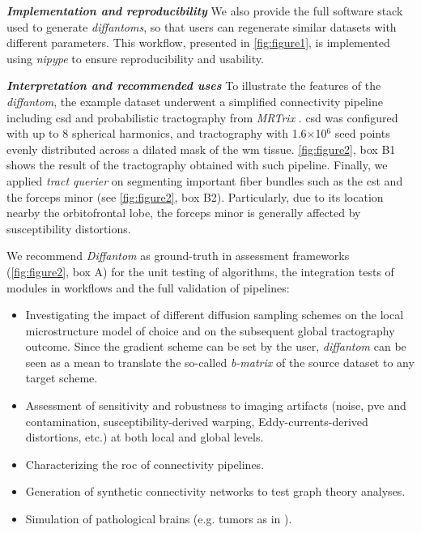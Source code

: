 \documentclass[english]{frontiers/frontiersSCNS} %
\newcommand*\glslines[2][]{\glslink[#1]{#2}{\glsdisp{#2}{\acrlong{#2} --\glsentryshort{#2}--}}}
\begin{document}
\noindent\textbf{\textit{Implementation and reproducibility\textcolon}\label{sec:data_workflow}} %
We also provide the full software stack used to generate \emph{diffantoms}, so that users can
  regenerate similar datasets with different parameters.
This workflow, presented in \autoref{fig:figure1}, is implemented using
  \emph{nipype} \citep{gorgolewski_nipype_2011} to ensure reproducibility and usability.

\noindent\textbf{\textit{Interpretation and recommended uses\textcolon}\label{sec:data_use}} %
To illustrate the features of the \emph{diffantom}, the example dataset underwent a simplified
  connectivity pipeline including \gls*{csd} and probabilistic tractography from
  \emph{MRTrix} \citep{tournier_mrtrix_2012}.
\Gls*{csd} was configured with up to 8 spherical harmonics, and tractography with 1.6$\times$10$^\text{6}$
  seed points evenly distributed across a dilated mask of the \gls*{wm} tissue.
\autoref{fig:figure2}, box B1 shows the result of the tractography obtained with such pipeline.
Finally, we applied \emph{tract querier} \citep{wassermann_on_2013} on segmenting important fiber bundles such
  as the \gls*{cst} and the forceps minor (see \autoref{fig:figure2}, box B2).
Particularly, due to its location nearby the orbitofrontal lobe, the forceps minor is generally affected by
  susceptibility distortions.

We recommend \emph{Diffantom} as ground-truth in assessment frameworks (\autoref{fig:figure2}, box A)
  for the unit testing of algorithms, the integration tests of modules in workflows and the full
  validation of pipelines:
\begin{itemize}
  \item Investigating the impact of different diffusion sampling schemes on the local microstructure
    model of choice and on the subsequent global tractography outcome.
  Since the gradient scheme can be set by the user, \emph{diffantom} can be seen as a mean to translate the so-called
  \emph{b-matrix} of the source dataset to any target scheme.
  \item Assessment of sensitivity and robustness to imaging artifacts (noise, \acrlong{pve} and \glslines{csf} contamination,
    susceptibility-derived warping, Eddy-currents-derived distortions, etc.) at both local and global levels.
  \item Characterizing the \acrfull*{roc} of connectivity pipelines.
  \item Generation of synthetic connectivity networks to test graph theory analyses.
  \item Simulation of pathological brains (e.g. tumors as in \cite{kaus_simulation_2000}).
\end{itemize}
\end{document}
